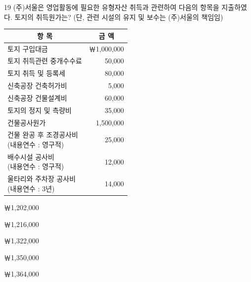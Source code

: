\begin{question}{19}
(주)서울은 영업활동에 필요한 유형자산 취득과 관련하여 다음의 항목을 지출하였다. 토지의 취득원가는? (단, 관련 시설의 유지 및 보수는 (주)서울의 책임임)

{\small\centering
\begin{tabular}{|l|r|}
\hline
\multicolumn{1}{|c|}{항 목} & \multicolumn{1}{c|}{금 액} \\
\hline
토지 구입대금 & ￦1,000,000 \\
토지 취득관련 중개수수료 & 50,000 \\
토지 취득 및 등록세 & 80,000 \\
신축공장 건축허가비 & 5,000 \\
신축공장 건물설계비 & 60,000 \\
토지의 정지 및 측량비 & 35,000 \\
건물공사원가 & 1,500,000 \\
\makecell[l]{건물 완공 후 조경공사비\\(내용연수 : 영구적)} & 25,000 \\
\makecell[l]{배수시설 공사비\\(내용연수 : 영구적)} & 12,000 \\
\makecell[l]{울타리와 주차장 공사비\\(내용연수 : 3년)} & 14,000 \\
\hline
\end{tabular}\par}

\begin{choices}
  \item ￦1,202,000
  \item ￦1,216,000
  \item ￦1,322,000
  \item ￦1,350,000
  \item ￦1,364,000
\end{choices}
\end{question}
